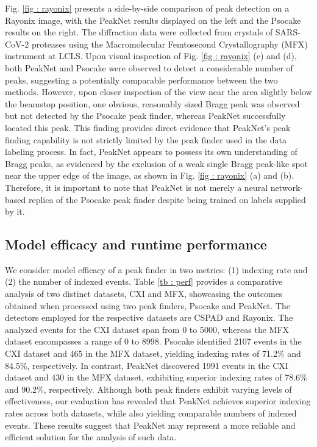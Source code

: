 \documentclass[conference]{IEEEtran}
\newcommand{\peaknet}{PeakNet}
\newcommand{\psocake}{Psocake}
\begin{document}
Fig. \ref{fig : rayonix} presents a side-by-side comparison of peak detection on
a Rayonix image, with the \peaknet{} results displayed on the left and the
\psocake{} results on the right.  The diffraction data were collected from
crystals of SARS-CoV-2 proteases using the Macromolecular Femtosecond
Crystallography (MFX) instrument
\citep{sierraMacromolecularFemtosecondCrystallography2019} at LCLS.  Upon visual
inspection of Fig. \ref{fig : rayonix} (c) and (d), both \peaknet{} and
\psocake{} were observed to detect a considerable number of peaks, suggesting a
potentially comparable performance between the two methods.  However, upon
closer inspection of the view near the area slightly below the beamstop position,
one obvious, reasonably sized Bragg peak was observed but not detected by the
\psocake{} peak finder, whereas \peaknet{} successfully located this peak.  This
finding provides direct evidence that \peaknet{}'s peak finding capability is
not strictly limited by the peak finder used in the data labeling process.  In
fact, \peaknet{} appears to possess its own understanding of Bragg peaks, as
evidenced by the exclusion of a weak single Bragg peak-like spot near the upper
edge of the image, as shown in Fig. \ref{fig : rayonix} (a) and (b).  Therefore,
it is important to note that \peaknet{} is not merely a neural network-based
replica of the \psocake{} peak finder despite being trained on labels supplied
by it.


\subsection{Model efficacy and runtime performance}

We consider model efficacy of a peak finder in two metrics: (1) indexing rate
and (2) the number of indexed events.  Table \ref{tb : perf} provides a
comparative analysis of two distinct datasets, CXI and MFX, showcasing the
outcomes obtained when processed using two peak finders, \psocake{} and
\peaknet{}.  The detectors employed for the respective datasets are CSPAD and
Rayonix.  The analyzed events for the CXI dataset span from 0 to 5000, whereas
the MFX dataset encompasses a range of 0 to 8998.  \psocake{} identified 2107
events in the CXI dataset and 465 in the MFX dataset, yielding indexing rates of
71.2\% and 84.5\%, respectively.  In contrast, \peaknet{} discovered 1991 events
in the CXI dataset and 430 in the MFX dataset, exhibiting superior indexing
rates of 78.6\% and 90.2\%, respectively.  Although both peak finders exhibit
varying levels of effectiveness, our evaluation has revealed that \peaknet{}
achieves superior indexing rates across both datasets, while also yielding
comparable numbers of indexed events.  These results suggest that \peaknet{} may
represent a more reliable and efficient solution for the analysis of such data.
\end{document}
